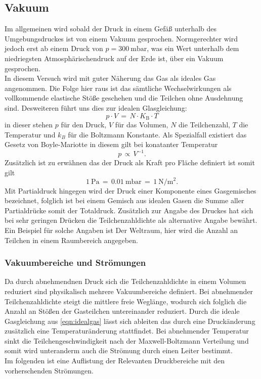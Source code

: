 \subsection{Vakuum}
\label{sec:vakuumtheo}

Im allgemeinen wird sobald der Druck in einem Gefäß unterhalb des Umgebungsdruckes ist von einem Vakuum gesprochen. Normgerechter 
wird jedoch erst ab einem Druck von $p=\SI{300}{\milli\bar}$, was ein Wert unterhalb dem niedriegsten Atmosphärischendruck auf der 
Erde ist, über ein Vakuum gesprochen.\\
In diesem Versuch wird mit guter Näherung das Gas als ideales Gas angenommen. Die Folge hier raus ist das sämtliche Wechselwirkungen 
als vollkommende elastische Stöße geschehen und die Teilchen ohne Ausdehnung sind. Desweiteren führt uns dies zur idealen Glasgleichung:
\begin {equation}
  p\cdot V\,=\, N\cdot K_\text{B}\cdot T
\label{eqn:idealgas}
\end{equation}
in dieser stehen $p$ für den Druck, $V$ für das Volumen, $N$ die Teilchenzahl, $T$ die Temperatur und $k_B$ für die Boltzmann Konstante. 
Als Spezialfall existiert das Gesetz von Boyle-Mariotte in diesem gilt bei konatanter Temperatur 
\begin {equation*}
 p\,\propto \, V^{-1}.
\end{equation*}
Zusätzlich ist zu erwähnen das der Druck als Kraft pro Fläche definiert ist somit gilt
\begin {equation*}
 \SI{1}{\pascal}\,=\,\SI{0.01}{\milli\bar}\,=\,\SI{1}{\newton\per\metre\squared}.
\end{equation*}
Mit Partialdruck hingegen wird der Druck einer Komponente eines Gasgemisches bezeichnet, folglich ist bei einem Gemisch aus 
idealen Gasen die Summe aller Partialdrücke somit der Totaldruck. Zusätzlich zur Angabe des Druckes hat sich bei sehr geringen 
Drücken die Teilchenzahldichte als alternative Angabe bewährt. Ein Beispiel für solche Angaben ist Der Weltraum, hier wird die 
Anzahl an Teilchen in einem Raumbereich angegeben.
\subsubsection{Vakuumbereiche und Strömungen}
Da durch abnehmendnen Druck sich die Teilchenzahldichte in einem Volumen reduziert sind physikalisch mehrere Vakuumbereiche 
definiert. Bei abnehmender Teilchenzahldichte steigt die mittlere freie Weglänge, wodurch sich folglich die Anzahl an Stößen der 
Gasteilchen untereinander reduziert. Durch die ideale Gasgleichung aus \autoref{eqn:idealgas} lässt sich ableiten das durch eine 
Druckänderung zusätzlich eine Temperaturänderung stattfindet. Bei abnehmender Temperatur sinkt die Teilchengeschwindigkeit nach der 
Maxwell-Boltzmann Verteilung und somit wird unteranderm auch die Strömung durch einen Leiter bestimmt.\\
Im folgenden ist eine Auflistung der Relevanten Druckbereiche mit den vorherschenden Strömungen.



